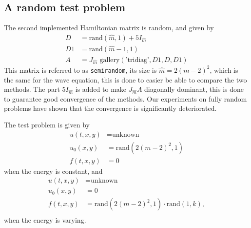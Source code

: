 
\subsection{A random test problem} %
\label{sec:random}
The second implemented Hamiltonian matrix is random, and given by
\begin{equation*}
\begin{aligned}
D &= \text{rand}(\hat{m},1) + 5 I_{\hat{m}} \\
D1 & = \text{rand}(\hat{m}-1,1) \\
A &= J_{\hat{m}} \text{ gallery}(\text{'tridiag'},D1,D,D1)
\end{aligned}
\end{equation*}
This matrix is referred to as \texttt{semirandom}, its size is $\hat{m} = 2(m-2)^2$, which is the same for the wave equation, this is done to easier be able to compare the two methods. The part $5 I_{\hat{m}} $ is added to make $J_{\hat{m}}A$ diagonally dominant, this is done to guarantee good convergence of the methods. Our experiments on fully random problems have shown that the convergence is significantly deteriorated. %

\noindent The test problem is given by
\begin{equation*}
\begin{aligned}
u(t,x,y) &= \text{unknown} \\
u_0(x,y) &= \text{rand} (2 (m-2)^2,1) \\
f(t,x,y) &= 0
\end{aligned}
\end{equation*}
when the energy is constant, and 
\begin{equation*}
\begin{aligned}
u(t,x,y) &= \text{unknown} \\
u_0(x,y) &= 0 \\
f(t,x,y) &= \text{rand} (2 (m-2)^2,1) \cdot \text{rand}(1,k), \\
\end{aligned}
\end{equation*}
when the energy is varying.\\

